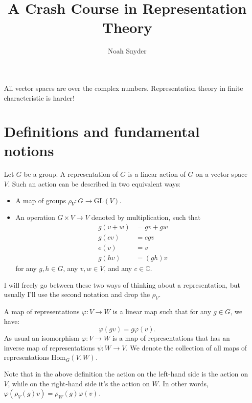 \documentclass[11pt]{article}
\begin{document}
\title{A Crash Course in Representation Theory}
\author{Noah Snyder}
\maketitle

All vector spaces are over the complex numbers. Representation theory in finite characteristic is harder!

\section{Definitions and fundamental notions}

\begin{definition}
Let $G$ be a group.  A representation of $G$ is a linear action of $G$ on a vector space $V$.  Such an action can be described in two equivalent ways:
\begin{itemize}
\item A map of groups $\rho_V: G \rightarrow \mathrm{GL}(V)$.
\item An operation $G \times V \rightarrow V$ denoted by multiplication, such that 
\begin{align*}
g(v+w) &= gv+gw \\
g(cv) &= c gv\\
e(v) &= v \\
g(hv) &=(gh)v
\end{align*}
 for any $g, h \in G$, any $v,w \in V$, and any $c \in \mathbb{C}$.
\end{itemize}
\end{definition}

I will freely go between these two ways of thinking about a representation, but usually I'll use the second notation and drop the $\rho_V$.

\begin{definition}
A map of representations $\varphi: V \rightarrow W$ is a linear map such that for any $g \in G$, we have:
$$\varphi(gv) = g \varphi(v).$$
As usual an isomorphism $\varphi: V \rightarrow W$ is a map of representations that has an inverse map of representations $\psi:W \rightarrow V$.
We denote the collection of all maps of representations $\mathrm{Hom}_G(V,W)$.
\end{definition}

Note that in the above definition the action on the left-hand side is the action on $V$, while on the right-hand side it's the action on $W$.  In other words, $\varphi(\rho_V(g)v) = \rho_W(g)\varphi(v)$.
\end{document}
